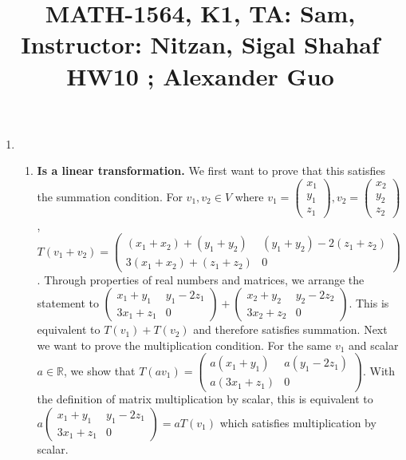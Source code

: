 \documentclass{article}
\title{\large{\vspace{-1.0cm}MATH-1564, K1, TA: Sam, Instructor: Nitzan, Sigal Shahaf \\ HW10 ; Alexander Guo}}
\date{}
\begin{document}
\maketitle

\vspace{-1.5cm}


\begin{enumerate}

\item

\begin{enumerate}

\item \textbf{Is a linear transformation.}  We first want to prove that this satisfies the summation condition. For $v_1,v_2 \in V$ where $v_1 = \left(\begin{array}{c} x_1 \\ y_1 \\ z_1 \end{array}\right), v_2 = \left(\begin{array}{c} x_2 \\ y_2 \\ z_2 \end{array}\right)$,\\ $T(v_1 + v_2) = \left(\begin{array}{cc} (x_1 + x_2) + (y_1 + y_2) & (y_1 + y_2) - 2 (z_1 + z_2) \\ 3(x_1 + x_2) + (z_1 + z_2) & 0 \end{array}\right)$. Through properties of real numbers and matrices, we arrange the statement to $\left(\begin{array}{cc} x_1 + y_1 & y_1 - 2z_1 \\ 3x_1 + z_1 & 0 \end{array}\right) + \left(\begin{array}{cc} x_2 + y_2 & y_2 - 2z_2 \\ 3x_2 + z_2 & 0 \end{array}\right)$. This is equivalent to $T (v_1) + T (v_2)$ and therefore satisfies summation. Next we want to prove the multiplication condition. For the same $v_1$ and scalar $a \in \mathbb{R}$, we show that $T(av_1) = \left(\begin{array}{cc} a(x_1 + y_1) & a(y_1 - 2z_1) \\ a(3x_1 + z_1) & 0 \end{array}\right)$. With the definition of matrix multiplication by scalar, this is equivalent to \\ $a \left(\begin{array}{cc} x_1 + y_1 & y_1 - 2z_1 \\ 3x_1 + z_1 & 0 \end{array}\right) = a T(v_1)$ which satisfies multiplication by scalar.


\end{enumerate}
\end{enumerate}
\end{document}
